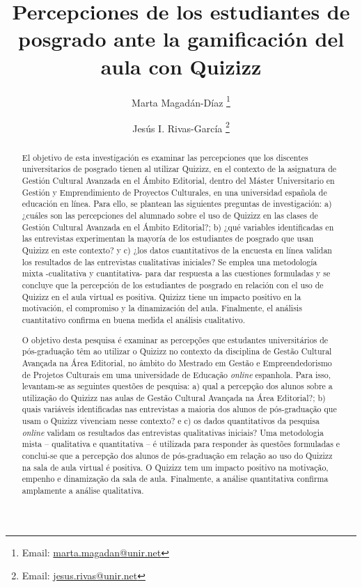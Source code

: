 \documentclass[spanish]{textolivre}
\title{Percepciones de los estudiantes de posgrado ante la gamificación del aula con Quizizz}
\author[1]{Marta Magadán-Díaz \orcid{0000-0003-3178-3215} \thanks{Email: \url{marta.magadan@unir.net}}}
\author[1]{Jesús I. Rivas-García \orcid{0000-0003-0576-5961} \thanks{Email: \url{jesus.rivas@unir.net}}}
\affil[1]{Universidad Internacional de La Rioja, Facultad de Empresa y Comunicación, La Rioja, España.}
\begin{document}
\maketitle

\begin{polyabstract}
\begin{abstract}
El objetivo de esta investigación es examinar las percepciones que los discentes universitarios de posgrado tienen al utilizar Quizizz, en el contexto de la asignatura de Gestión Cultural Avanzada en el Ámbito Editorial, dentro del Máster Universitario en Gestión y Emprendimiento de Proyectos Culturales, en una universidad española de educación en línea. Para ello, se plantean las siguientes preguntas de investigación: a) ¿cuáles son las percepciones del alumnado sobre el uso de Quizizz en las clases de Gestión Cultural Avanzada en el Ámbito Editorial?; b) ¿qué variables identificadas en las entrevistas experimentan la mayoría de los estudiantes de posgrado que usan Quizizz en este contexto? y c) ¿los datos cuantitativos de la encuesta en línea validan los resultados de las entrevistas cualitativas iniciales? Se emplea una metodología mixta -cualitativa y cuantitativa- para dar respuesta a las cuestiones formuladas y se concluye que la percepción de los estudiantes de posgrado en relación con el uso de Quizizz en el aula virtual es positiva. Quizizz tiene un impacto positivo en la motivación, el compromiso y la dinamización del aula. Finalmente, el análisis cuantitativo confirma en buena medida el análisis cualitativo.

\end{abstract}

\begin{portuguese}
\begin{abstract}
O objetivo desta pesquisa é examinar as percepções que estudantes universitários de pós-graduação têm ao utilizar o Quizizz no contexto da disciplina de Gestão Cultural Avançada na Área Editorial, no âmbito do Mestrado em Gestão e Empreendedorismo de Projetos Culturais em uma universidade de Educação \textit{online} espanhola. Para isso, levantam-se as seguintes questões de pesquisa: a) qual a percepção dos alunos sobre a utilização do Quizizz nas aulas de Gestão Cultural Avançada na Área Editorial?; b) quais variáveis identificadas nas entrevistas a maioria dos alunos de pós-graduação que usam o Quizizz vivenciam nesse contexto? e c) os dados quantitativos da pesquisa \textit{online} validam os resultados das entrevistas qualitativas iniciais? Uma metodologia mista – qualitativa e quantitativa – é utilizada para responder às questões formuladas e conclui-se que a percepção dos alunos de pós-graduação em relação ao uso do Quizizz na sala de aula virtual é positiva. O Quizizz tem um impacto positivo na motivação, empenho e dinamização da sala de aula. Finalmente, a análise quantitativa confirma amplamente a análise qualitativa.


\end{abstract}
\end{portuguese}
\end{polyabstract}
\end{document}
